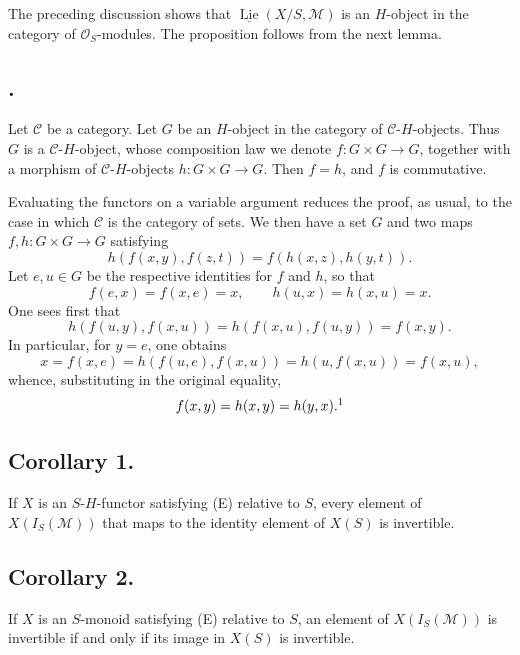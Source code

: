 The preceding discussion shows that
\(\underline{\operatorname{Lie}}(X/S,\mathcal M)\) is an \(H\)-object in
the category of \(\mathcal O_S\)-modules. The proposition follows from
the next lemma.

\subsection*{.}
Let \(\mathscr C\) be a category. Let \(G\) be an \(H\)-object in the
category of \(\mathscr C\)-\(H\)-objects. Thus \(G\) is a
\(\mathscr C\)-\(H\)-object, whose composition law we denote
\(f:G\times G\to G\), together with a morphism of
\(\mathscr C\)-\(H\)-objects \(h:G\times G\to G\).
Then \(f=h\), and \(f\) is commutative.

Evaluating the functors on a variable argument reduces the proof, as
usual, to the case in which \(\mathscr C\) is the category of sets. We
then have a set \(G\) and two maps \(f,h:G\times G\to G\) satisfying
\[
  h(f(x,y),f(z,t))=f(h(x,z),h(y,t)).
\]
Let \(e,u\in G\) be the respective identities for \(f\) and \(h\), so
that
\[
  f(e,x)=f(x,e)=x,
  \qquad h(u,x)=h(x,u)=x.
\]
One sees first that
\[
  h(f(u,y),f(x,u))=h(f(x,u),f(u,y))=f(x,y).
\]
In particular, for \(y=e\), one obtains
\[
  x=f(x,e)=h(f(u,e),f(x,u))=h(u,f(x,u))=f(x,u),
\]
whence, substituting in the original equality,
\[
  f(x,y)=h(x,y)=h(y,x).\footnotemark
\]

\subsection*{Corollary 1.}
If \(X\) is an \(S\)-\(H\)-functor satisfying (E) relative to \(S\),
every element of \(X(I_S(\mathcal M))\) that maps to the identity element
of \(X(S)\) is invertible.

\subsection*{Corollary 2.}
If \(X\) is an \(S\)-monoid satisfying (E) relative to \(S\), an element
of \(X(I_S(\mathcal M))\) is invertible if and only if its image in
\(X(S)\) is invertible.

